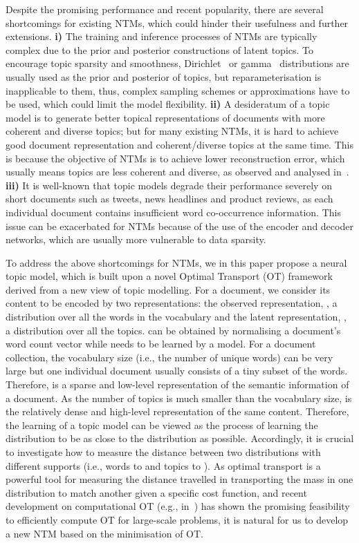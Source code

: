 \documentclass{article}
\begin{document}
Despite the promising performance and recent popularity, there are several shortcomings for existing NTMs, which could hinder their usefulness and further extensions.
\textbf{i)} The training and inference processes of NTMs are typically complex due to the prior and posterior constructions of latent topics.
To encourage topic sparsity and smoothness, Dirichlet~\citep{burkhardt2019decoupling} or gamma~\citep{zhang2018whai} distributions are usually used as 
the prior and posterior of topics, but reparameterisation is inapplicable to them, thus, complex sampling schemes or approximations have to be used, which could limit the model flexibility.
\textbf{ii)} A desideratum of a topic model is to generate better topical representations of documents with more coherent and diverse topics; 
but for many existing NTMs, it is hard to achieve good document representation and coherent/diverse topics at the same time.
This is because the objective of NTMs is to achieve lower reconstruction error, which usually means topics are less coherent and diverse, as observed and analysed in~\cite{srivastava2017autoencoding,burkhardt2019decoupling}. 
\textbf{iii)} It is well-known that topic models degrade their performance severely on short documents such as tweets, news headlines and product reviews, as each individual document contains insufficient word co-occurrence information.
This issue can be exacerbated for NTMs because of the use of the encoder and decoder networks, which are usually more vulnerable to data sparsity.

To address the above shortcomings for NTMs, we in this paper propose a neural topic model, which is built upon a novel Optimal Transport (OT) framework derived from a new view of topic modelling.
For a document, we consider its content to be encoded by two representations: the observed representation, , a distribution over all the words in the vocabulary and the latent representation, , a distribution over all the topics.
 can be obtained by normalising a document's word count vector while  needs to be learned by a model.
For a document collection, the vocabulary size (i.e., the number of unique words) can be very large but one individual document usually consists of a tiny subset of the words. Therefore,  is a sparse and low-level representation of the semantic information of a document.
As the number of topics is much smaller than the vocabulary size,  is the relatively dense and high-level representation of the same content.
Therefore, the learning of a topic model can be viewed as the process of learning the distribution  to be as close to the distribution  as possible.
Accordingly, it is crucial to investigate how to measure the distance between two distributions with different supports (i.e., words to  and topics to ).
As optimal transport is a powerful tool for measuring the distance travelled in transporting the mass in one distribution to match another given a specific cost function,
and recent development on computational OT (e.g., in~\citet{cuturi2013sinkhorn,frogner2015learning,seguy2018large,peyre2019computational}) has shown the promising feasibility to efficiently compute OT for large-scale problems, it is natural for us to develop a new NTM based on the minimisation of OT.
\end{document}
